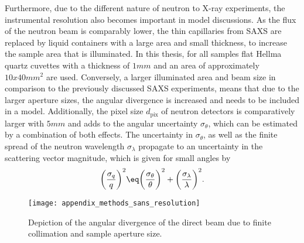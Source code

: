 \documentclass[\main/dresen_thesis.tex]{subfiles}
\begin{document}
    Furthermore, due to the different nature of neutron to X-ray experiments, the instrumental resolution also becomes important in model discussions.
    As the flux of the neutron beam is comparably lower, the thin capillaries from SAXS are replaced by liquid containers with a large area and small thickness, to increase the sample area that is illuminated.
    In this thesis, for all samples flat Hellma quartz cuvettes with a thickness of $1 \unit{mm}$ and an area of approximately  $10x40 \unit{mm^2}$ are used.
    Conversely, a larger illuminated area and beam size in comparison to the previously discussed SAXS experiments, means that due to the larger aperture sizes, the angular divergence is increased and needs to be included in a model.
    Additionally, the pixel size $d_\mathrm{pix}$ of neutron detectors is comparatively larger with $5 \unit{mm}$ and adds to the angular uncertainty $\sigma_\theta$, which can be estimated by a combination of both effects.
    The uncertainty in $\sigma_\theta$, as well as the finite spread of the neutron wavelength $\sigma_\lambda$ propagate to an uncertainty in the scattering vector magnitude, which is given for small angles by
    \begin{align}
      \biggl( \frac{\sigma_q}{q} \biggr)^2 \eq \biggl( \frac{\sigma_\theta}{\theta} \biggr)^2 + \biggl(\frac{\sigma_\lambda}{\lambda}\biggr)^2.
    \end{align}

    \begin{figure}[tb]
      \centering
      \texttt{[image: appendix\_methods\_sans\_resolution]}
      \caption{\label{fig:methods:sans:resolution}Depiction of the angular divergence of the direct beam due to finite collimation and sample aperture size.}
    \end{figure}
\end{document}
